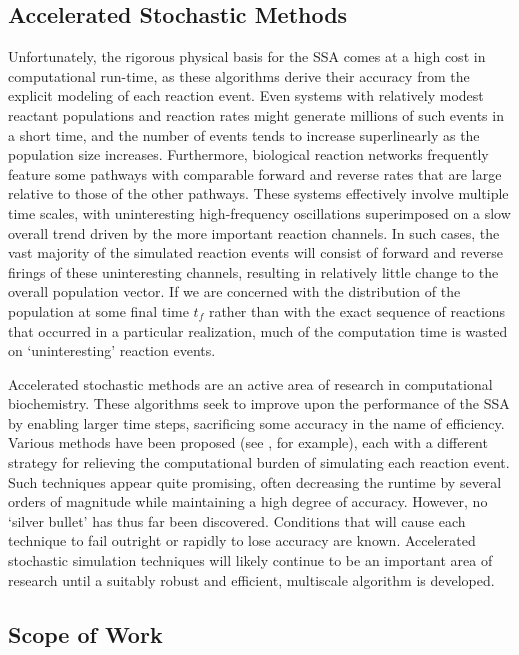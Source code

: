 \documentclass[12pt]{article}
\begin{document}
\subsection{Accelerated Stochastic Methods}

Unfortunately, the rigorous physical basis for the SSA comes at a high
cost in computational run-time, as these algorithms derive their
accuracy from the explicit modeling of each reaction event.  Even
systems with relatively modest reactant populations and reaction rates
might generate millions of such events in a short time, and the number
of events tends to increase superlinearly as the population size increases.
Furthermore, biological reaction networks frequently feature some
pathways with comparable forward and reverse rates that are large
relative to those of the other pathways.  These systems effectively
involve multiple time scales, with uninteresting high-frequency
oscillations superimposed on a slow overall trend driven by the more
important reaction channels.  In such cases, the vast majority of the
simulated reaction events will consist of forward and reverse firings
of these uninteresting channels, resulting in relatively little change
to the overall population vector.  If we are concerned with the
distribution of the population at some final time $t_f$ rather than
with the exact sequence of reactions that occurred in a particular
realization, much of the computation time is wasted on `uninteresting'
reaction events.

Accelerated stochastic methods are an active area of research in
computational biochemistry.  These algorithms seek to improve upon the
performance of the SSA by enabling larger time steps, sacrificing some
accuracy in the name of efficiency.  Various methods have been
proposed (see \cite{Gillespie01, rao-arkin-02, SPEA1, SPEA2,
frankowicz-moreau+93}, for example), each with a different
strategy for relieving the computational burden of simulating each
reaction event.  Such techniques appear quite promising, often
decreasing the runtime by several orders of magnitude while
maintaining a high degree of accuracy.  However, no `silver bullet'
has thus far been discovered. Conditions that will cause each
technique to fail outright or rapidly to lose accuracy are known.
Accelerated stochastic simulation techniques will likely continue to
be an important area of research until a suitably robust and
efficient, multiscale algorithm is developed.


\subsection{Scope of Work}
\end{document}
